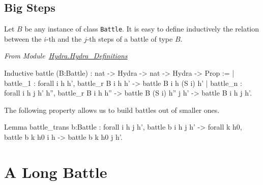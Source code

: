 \subsection{Big Steps}

Let $B$ be any instance of class \texttt{Battle}. It is easy to define inductively the relation between the $i$-th and the $j$-th steps of a battle of type $B$.

\vspace{4pt}
\emph{From Module~\href{../theories/html/hydras.Hydra.Hydra_Definitions.html\#fight}{Hydra.Hydra\_Definitions}}

\begin{Coqsrc}
Inductive battle (B:Battle) : nat -> Hydra -> nat -> Hydra -> Prop :=
| battle_1 : forall i h  h', 
      battle_r   B i  h h' -> battle B i h (S i) h'
| battle_n : forall i h  j h' h'',  
      battle_r  B i h h''  ->
      battle B (S i) h'' j h'  ->
      battle B i h j h'.
\end{Coqsrc}

The following property allows us to build battles out of smaller ones.

\begin{Coqsrc}
Lemma battle_trans {b:Battle} :
  forall i h j h', battle b i h j h' ->
        forall k h0,  battle b k h0 i h -> battle b k h0 j h'.
\end{Coqsrc}



 




\section{A Long Battle}
\label{sect:big-battle}


